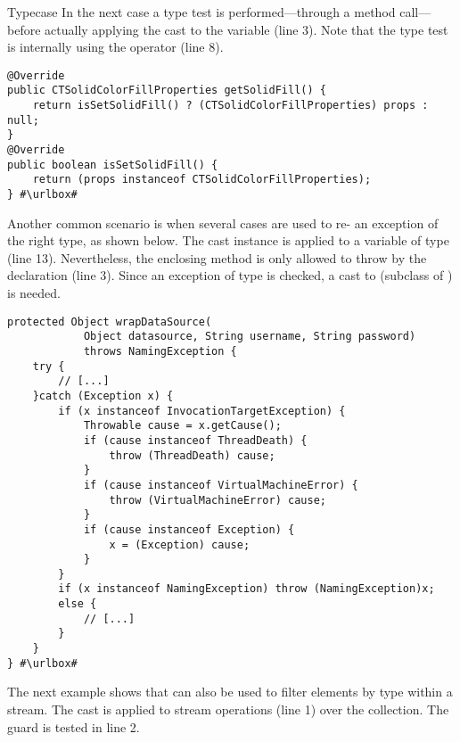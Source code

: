 \begin{pattern}{Typecase}
In the next case a type test is performed---through a method call---before actually applying the cast to the variable  (line 3).
Note that the type test is internally using the  operator (line 8).

\def\urlvar{http://bit.ly/apache_poi_2FW5SXU}
\begin{verbatim}
@Override
public CTSolidColorFillProperties getSolidFill() {
    return isSetSolidFill() ? (CTSolidColorFillProperties) props : null;
}
@Override
public boolean isSetSolidFill() {
    return (props instanceof CTSolidColorFillProperties);
} #\urlbox#
\end{verbatim}

Another common scenario is when several cases are used to re-
an exception of the right type, as shown below.
The cast instance is applied to a variable of type 
(line 13).
Nevertheless, the enclosing method is only allowed to throw  by the  declaration (line 3).
Since an exception of type  is checked,
a cast to  (subclass of ) is needed.

\def\urlvar{http://bit.ly/codefollower_Tomcat_Research_2SGDUG5}
\begin{verbatim}
protected Object wrapDataSource(
			Object datasource, String username, String password)
			throws NamingException {
	try {
		// [...]
	}catch (Exception x) {
		if (x instanceof InvocationTargetException) {
			Throwable cause = x.getCause();
			if (cause instanceof ThreadDeath) {
				throw (ThreadDeath) cause;
			}
			if (cause instanceof VirtualMachineError) {
				throw (VirtualMachineError) cause;
			}
			if (cause instanceof Exception) {
				x = (Exception) cause;
			}
		}
		if (x instanceof NamingException) throw (NamingException)x;
		else {
			// [...]
		}
	}
} #\urlbox#
\end{verbatim}

The next example shows that \thisp{} can also be used to filter elements by type within a stream.
The cast is applied to stream operations (line 1) over the  collection.
The  guard is tested in line 2.


\end{pattern}
